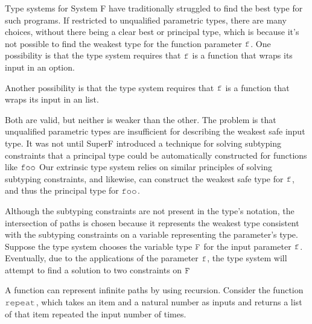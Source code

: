 \documentclass[acmsmall]{acmart}
\theoremstyle{definition}
\begin{document}
\noindent
Type systems for System F have traditionally struggled to find the best
type for such programs. If restricted to unqualified parametric types, there are many choices,
without there being a clear best or principal type, 
which is because it's not possible to find the weakest type for the function parameter
$\J{f}$.
One possibility is that the type system requires that $\J{f}$ is a function that wraps its
input in an option. 


\noindent
Another possibility is that the type system requires that $\J{f}$ is a function that wraps its
input in an list. 


\noindent
Both are valid, but neither is weaker than the other. The problem is that unqualified parametric
types are insufficient for describing the weakest safe input type.
It was not until SuperF introduced a technique for solving subtyping constraints
that a principal type could be automatically constructed for functions like $\J{foo}$
Our extrinsic type system relies on similar principles of solving subtyping constraints,
and likewise, can construct the weakest safe type for $\J{f}$, and thus the principal type for $\J{foo}$.


\noindent
Although the subtyping constraints are not present in the type's notation,
the intersection of paths is chosen because it represents the weakest type
consistent with the subtyping constraints on a variable representing the parameter's type. 
Suppose the type system chooses the variable type $\J{F}$ for the input parameter $\J{f}$.
Eventually, due to the applications of the parameter $\J{f}$, the type
system will attempt to find a solution to two constraints on $\J{F}$


A function can represent infinite paths by using recursion.
Consider the function $\J{repeat}$, which takes an item and a natural number
as inputs and returns a list of that item repeated the input number of times.

\examp{
  \J{def repeat = [x => loop([self => [}
  \\
  \I \J{[zero;@ => nil;@]}
  \\
  \I \J{[succ;n => <cons>(x,self(n))]}
  \\
  \J{])]}
}
\end{document}

